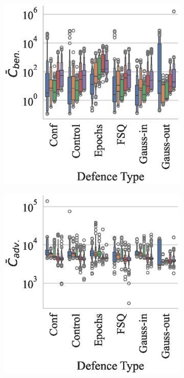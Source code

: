 \begin{figure}
    \centering
    \begin{subfigure}[]{.3\textwidth}
        \centering
        \includegraphics[width=\textwidth]{mnist/ben_failures_per_train_time_vs_defence_type.eps}
    \end{subfigure}
    \begin{subfigure}[]{0.3\textwidth}
        \includegraphics[width=\textwidth]{mnist/adv_failures_per_train_time_vs_defence_type.eps}

\end{subfigure}
\end{figure}

